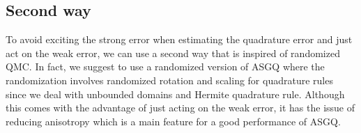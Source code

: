 \subsection{Second way}
To avoid exciting the strong error when estimating the quadrature error and just act on the weak error, we can use a second way that is inspired of randomized QMC. In fact, we suggest to use a randomized version of ASGQ where the randomization involves randomized rotation and scaling for quadrature rules since we deal with unbounded domains and Hermite quadrature rule. Although this comes with the advantage of just acting on the weak error, it has the issue of reducing anisotropy which is a main feature for a good performance of ASGQ.